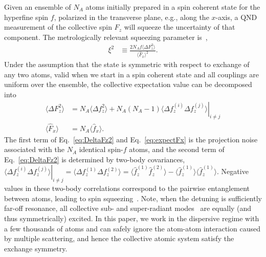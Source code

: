 \documentclass[preprint,aps,pra,onecolumn,superscriptaddress]{revtex4-1} %
\newcommand{\expect}[1]{\big\langle #1 \big\rangle}
\begin{document}
Given an ensemble of $N_A$ atoms initially prepared in a spin coherent state for the hyperfine spin $f$, polarized in the transverse plane, e.g., along the $x$-axis, a QND measurement of the collective spin  $F_z$ will squeeze the uncertainty of that component.  The metrologically relevant squeezing parameter is~\cite{Wineland1992},
\begin{align}\label{eq:xi2Faraday}
\xi^2 &\equiv  \frac{2 N_A f\expect{\Delta F_z ^2}}{\expect{\hat{F}_x}^2}.
\end{align}
Under the assumption that the state is symmetric with respect to exchange of any two atoms, valid when we start in a spin coherent state and all couplings are uniform over the ensemble, the collective expectation value can be decomposed into 
\begin{subequations}\label{eq:Ftof_squeezing}
\begin{align}
\expect{\Delta F_z^2} &= N_A \expect{\Delta f_z^2}+N_A(N_A-1)\left. \expect{\Delta f_z^{(i)}\Delta f_z^{(j)}}\right|_{i\neq j}\label{eq:DeltaFz2}\\
\expect{\hat{F}_x } & =N_A \expect{\hat{f}_x} \label{eq:expectFx}.
\end{align}
\end{subequations}
 The first term of Eq.~\eqref{eq:DeltaFz2} and Eq.~\eqref{eq:expectFx} is the projection noise associated with the  $N_A$ identical spin-$f$  atoms, and  the second term of Eq.~\eqref{eq:DeltaFz2} is determined by two-body covariances, $ \left.\expect{\Delta f_z^{(i)}\Delta f_z^{(j)}}\right|_{i\neq j}=\expect{\Delta f_z^{(1)}\Delta f_z^{(2)}} = \expect{\hat{f}_z^{(1)}\hat{f}_z^{(2)}}-\expect{\hat{f}_z^{(1)}} \expect{\hat{f}_z^{(1)}} $.  Negative values in these two-body correlations correspond to the pairwise entanglement between atoms, leading to spin squeezing~\cite{Wang2003Spin}.  Note, when the detuning is sufficiently far-off resonance, all collective sub- and super-radiant modes~\cite{Asenjo-Garcia2017Atom,Asenjo-Garcia2017Exponential} are equally (and thus symmetrically) excited.  In this paper, we work in the dispersive regime with a few thousands of atoms and can safely ignore the atom-atom interaction caused by multiple scattering, and hence the collective atomic system satisfy the exchange symmetry. 
\end{document}
